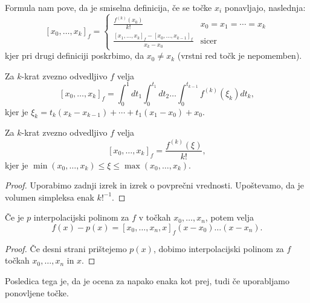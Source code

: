 
Formula nam pove, da je smiselna definicija, če se točke $x_i$ ponavljajo,
naslednja:
\[
  [x_0, \ldots, x_k]_f =
  \begin{cases}
	\frac{f^{(k)}(x_0)}{k!} & x_0 = x_1 = \cdots = x_k  \\
	\frac{[x_1, \ldots, x_k]_f - [x_0, \ldots, x_{k-1}]_f}{x_k - x_0} & \text{sicer}
  \end{cases}
\]
kjer pri drugi definiciji poskrbimo, da $x_0 \ne x_k$ (vrstni red točk je
nepomemben).

\begin{izrek}
  Za $k$-krat zvezno odvedljivo $f$ velja
  \[
	[x_0, \ldots, x_k]_f = \int_0^1 dt_1 \int_0^{t_1} d t_2 \ldots
	\int_0^{t_{k-1}} f^{(k)}(\xi_k) dt_k,
  \]
  kjer je $\xi_k = t_k(x_k - x_{k-1}) + \cdots + t_1 (x_1 - x_0) + x_0$.
\end{izrek}

\begin{posledica}
  Za $k$-krat zvezno odvedljivo $f$ velja
  \[
	[x_0, \ldots, x_k]_f = \frac{f^{(k)}(\xi)}{k!},
  \]
  kjer je $\min(x_0, \ldots, x_k) \le \xi \le \max(x_0, \ldots, x_k)$.
\end{posledica}

\begin{proof}
  Uporabimo zadnji izrek in izrek o povprečni vrednosti.
  Upoštevamo, da je volumen simpleksa enak $k!^{-1}$.
\end{proof}

\begin{izrek}
  Če je $p$ interpolacijski polinom za $f$ v točkah $x_0, \ldots, x_n$, potem
  velja
  \[
	f(x) - p(x) = [x_0,\ldots, x_n, x]_f (x - x_0) \ldots (x-x_n).
  \]
\end{izrek}

\begin{proof}
  Če desni strani prištejemo $p(x)$, dobimo interpolacijski polinom za $f$
  točkah $x_0, \ldots, x_n$ in $x$.
\end{proof}

Posledica tega je, da je ocena za napako enaka kot prej, tudi če uporabljamo
ponovljene točke.


